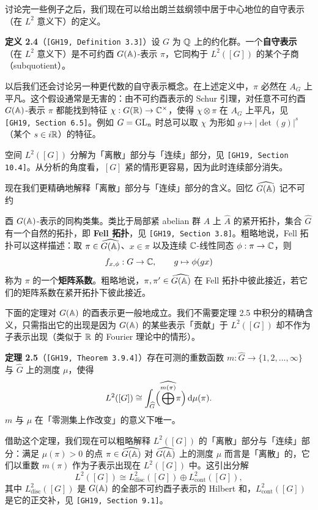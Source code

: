 讨论完一些例子之后，我们现在可以给出朗兰兹纲领中居于中心地位的自守表示（在 $L^2$ 意义下）的定义。

\noindent\textbf{定义 2.4}（\texttt{[GH19, Definition 3.3]}）\label{def:2.4}\quad 设 $G$ 为 $\mathbb{Q}$ 上的约化群。一个\textbf{自守表示}（在 $L^2$ 意义下）是不可约酉 $G(\mathbb{A})$-表示 $\pi$，它同构于 $L^2([G])$ 的某个子商（subquotient）。

以后我们还会讨论另一种更代数的自守表示概念。在上述定义中，$\pi$ 必然在 $A_G$ 上平凡。这个假设通常是无害的：由不可约酉表示的 Schur 引理，对任意不可约酉 $G(\mathbb{A})$-表示 $\pi$ 都能找到特征 $\chi:G(\mathbb{R})\to\mathbb{C}^\times$，使得 $\chi\otimes\pi$ 在 $A_G$ 上平凡，见 \texttt{[GH19, Section 6.5]}。例如 $G=\operatorname{GL}_n$ 时总可以取 $\chi$ 为形如 $g\mapsto|\det(g)|^s$（某个 $s\in i\mathbb{R}$）的特征。

空间 $L^2([G])$ 分解为「离散」部分与「连续」部分，见 \texttt{[GH19, Section 10.4]}。从分析的角度看，$[G]$ 紧的情形更容易，因为此时连续部分消失。

现在我们更精确地解释「离散」部分与「连续」部分的含义。回忆 $\widehat{G(\mathbb{A})}$ 记不可约

酉 $G(\mathbb{A})$-表示的同构类集。类比于局部紧 abelian 群 $A$ 上 $\widehat A$ 的紧开拓扑，集合 $\widehat G$ 有一个自然的拓扑，即 \textbf{Fell 拓扑}，见 \texttt{[GH19, Section 3.8]}。粗略地说，Fell 拓扑可以这样描述：取 $\pi\in\widehat{G(\mathbb{A})}$、$x\in\pi$ 以及连续 $\mathbb{C}$-线性同态 $\phi:\pi\to\mathbb{C}$，则
\[
f_{x,\phi}:G\to\mathbb{C},\qquad g\mapsto\phi(gx)
\]
称为 $\pi$ 的一个\textbf{矩阵系数}。粗略地说，$\pi,\pi'\in\widehat{G(\mathbb{A})}$ 在 Fell 拓扑中彼此接近，若它们的矩阵系数在紧开拓扑下彼此接近。

下面的定理对 $G(\mathbb{A})$ 的酉表示更一般地成立。我们不需要定理 2.5 中积分的精确含义，只需指出它的出现是因为 $G(\mathbb{A})$ 的某些表示「贡献」于 $L^2([G])$ 却不作为子表示出现（类似于 $\mathbb{R}$ 的 Fourier 理论中的情形）。

\noindent\textbf{定理 2.5}（\texttt{[GH19, Theorem 3.9.4]}）\label{thm:2.5}\quad 存在可测的重数函数 $m:\widehat G\to\{1,2,\dots,\infty\}$ 与 $\widehat G$ 上的测度 $\mu$，使得
\[
L^2([G])\cong\int_{\widehat G}\Bigl(\widehat{\bigoplus^{m(\pi)}}\pi\Bigr)\,\mathrm{d}\mu(\pi).
\]
$m$ 与 $\mu$ 在「零测集上作改变」的意义下唯一。

借助这个定理，我们现在可以粗略解释 $L^2([G])$ 的「离散」部分与「连续」部分：满足 $\mu(\pi)>0$ 的点 $\pi\in\widehat{G(\mathbb{A})}$ 对 $\widehat{G(\mathbb{A})}$ 上的测度 $\mu$ 而言是「离散」的，它们以重数 $m(\pi)$ 作为子表示出现在 $L^2([G])$ 中。这引出分解
\[
L^2([G])\cong L^2_{\mathrm{disc}}([G])\oplus L^2_{\mathrm{cont}}([G]),
\]
其中 $L^2_{\mathrm{disc}}([G])$ 是 $G(\mathbb{A})$ 的全部不可约酉子表示的 Hilbert 和，$L^2_{\mathrm{cont}}([G])$ 是它的正交补，见 \texttt{[GH19, Section 9.1]}。

